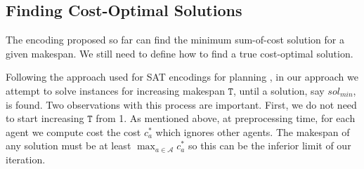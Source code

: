 






\subsection{Finding Cost-Optimal Solutions}
The encoding proposed so far can find the minimum sum-of-cost solution for a given makespan. We still need to define how to find a true cost-optimal solution.

Following the approach used for SAT encodings for planning \cite{KautzS92}, in our approach we attempt to solve instances for increasing makespan $\mathtt{T}$, until a solution, say $sol_{min}$, is found. Two observations with this process are important. First, we do not need to start increasing $\mathtt{T}$ from 1. As mentioned above, at preprocessing time, for each agent we compute cost the cost $c^*_a$ which ignores other agents. The makespan of any solution must be at least $\max_{a\in\mathcal{A}} c^*_a$ so this can be the inferior limit of our iteration.

